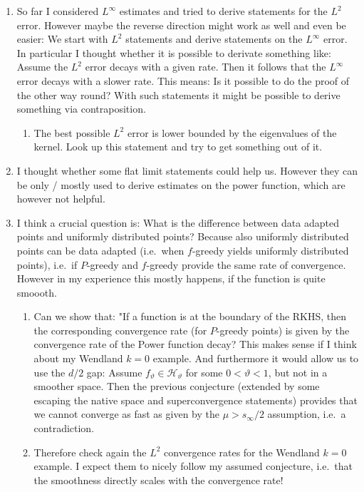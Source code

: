 \documentclass[a4paper, 10pt]{article}
\newcommand{\Ht}{\mathcal{H}_{\vartheta}}
\begin{document}
\begin{enumerate}
\item So far I considered $L^\infty$ estimates and tried to derive statements for the $L^2$ error.
However maybe the reverse direction might work as well and even be easier: 
We start with $L^2$ statements and derive statements on the $L^\infty$ error.
In particular I thought whether it is possible to derivate something like:
Assume the $L^2$ error decays with a given rate. 
Then it follows that the $L^\infty$ error decays with a slower rate.
This means: 
Is it possible to do the proof of \cite{wendland1999meshless} the other way round?
With such statements it might be possible to derive something via contraposition.
\begin{enumerate}
\item The best possible $L^2$ error is lower bounded by the eigenvalues of the kernel. 
Look up this statement and try to get something out of it.
\end{enumerate}
\item I thought whether some flat limit statements could help us.
However they can be only / mostly used to derive estimates on the power function, which are however not helpful.
\item I think a crucial question is: What is the difference between data adapted points and uniformly distributed points?
Because also uniformly distributed points can be data adapted (i.e.\ when $f$-greedy yields uniformly distributed points), 
i.e.\ if $P$-greedy and $f$-greedy provide the same rate of convergence. \\
However in my experience this mostly happens, if the function is quite smoooth.
\begin{enumerate}
\item Can we show that: "If a function is at the boundary of the RKHS, then the corresponding convergence rate (for $P$-greedy points) is given by the convergence rate of the Power function decay?
This makes sense if I think about my Wendland $k=0$ example.
And furthermore it would allow us to use the $d/2$ gap: 
Assume $f_\vartheta \in \Ht$ for some $0 < \vartheta < 1$, but not in a smoother space.
Then the previous conjecture (extended by some escaping the native space and superconvergence statements) provides that we cannot converge as fast as given by the $\mu > s_\infty/2$ assumption, i.e.\ a contradiction.
\item Therefore check again the $L^2$ convergence rates for the Wendland $k=0$ example.
I expect them to nicely follow my assumed conjecture, i.e.\ that the smoothness directly scales with the convergence rate!

\end{enumerate}
\end{enumerate}
\end{document}
